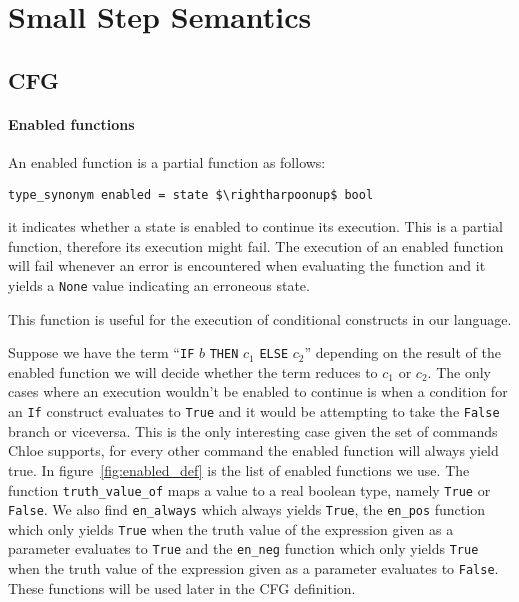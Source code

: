 \section{Small Step Semantics}\label{section:small_step}

\begin{comment}
add a little summary here.
\end{comment}

\subsection{CFG}\label{subsection:cfg}

\paragraph{Enabled functions}\label{paragraph:enabled}

An enabled function is a partial function as follows:

\begin{lstlisting}[mathescape=true, frame=single]
type_synonym enabled = state $\rightharpoonup$ bool
\end{lstlisting}

it indicates whether a state is enabled to continue its execution.
This is a partial function, therefore its execution might fail.
The execution of an enabled function will fail whenever an error is encountered when evaluating the function and it yields a \verb|None| value indicating an erroneous state.

This function is useful for the execution of conditional constructs in our language.

Suppose we have the term ``\verb|IF| $b$ \verb|THEN| $c_{1}$ \verb|ELSE| $c_{2}$'' depending on the result of the enabled function we will decide whether the term reduces to $c_{1}$ or $c_{2}$.
The only cases where an execution wouldn't be enabled to continue is when a condition for an \verb|If| construct evaluates to \verb|True| and it would be attempting to take the \verb|False| branch or viceversa.
This is the only interesting case given the set of commands Chloe supports, for every other command the enabled function will always yield true.
In figure~\ref{fig:enabled_def} is the list of enabled functions we use.
The function \verb|truth_value_of| maps a value to a real boolean type, namely \verb|True| or \verb|False|.
We also find \verb|en_always| which always yields \verb|True|, the \verb|en_pos| function which only yields \verb|True| when the truth value of the expression given as a parameter evaluates to \verb|True| and the \verb|en_neg| function which only yields \verb|True| when the truth value of the expression given as a parameter evaluates to \verb|False|.
These functions will be used later in the CFG definition.

